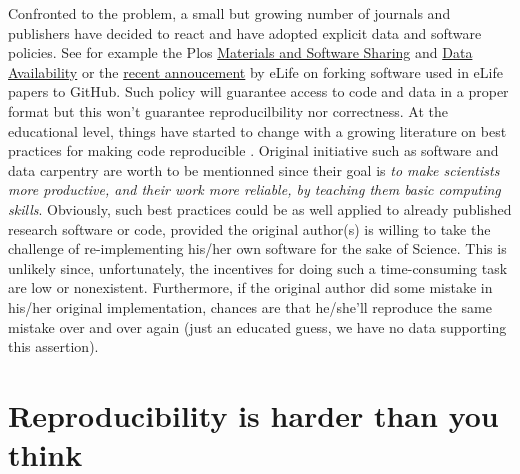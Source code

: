\documentclass[a4paper,10pt, twocolumn]{article}
\begin{document}
Confronted to the problem, a small but growing number of journals and
publishers have decided to react and have adopted explicit data and software
policies. See for example the Plos
\href{http://journals.plos.org/plosone/s/materials-and-software-sharing}{Materials
  and Software Sharing} and
\href{http://journals.plos.org/plosone/s/data-availability}{Data Availability}
or the
\href{https://elifesciences.org/elife-news/inside-elife-forking-software-used-elife-papers-github}{recent
  annoucement} by eLife on forking software used in eLife papers to GitHub.
Such policy will guarantee access to code and data in a proper format
\citep{perkel:2016} but this won't guarantee reproducilbility nor
correctness. At the educational level, things have started to change with a
growing literature on best practices for making code reproducible
\citep{sandve:2013, crook:2013, wilson:2014, halchenko:2015, janz:2015,
  hinsen:2015}. Original initiative such as software and data carpentry
\citep{wilson:2016} are worth to be mentionned since their goal is {\em to make
  scientists more productive, and their work more reliable, by teaching them
  basic computing skills}. Obviously, such best practices could be as well
applied to already published research software or code, provided the original
author(s) is willing to take the challenge of re-implementing his/her own
software for the sake of Science. This is unlikely since, unfortunately, the
incentives for doing such a time-consuming task are low or nonexistent.
Furthermore, if the original author did some mistake in his/her original
implementation, chances are that he/she'll reproduce the same mistake over and
over again (just an educated guess, we have no data supporting this
assertion).\\



\section*{Reproducibility is harder than you think}
\end{document}
